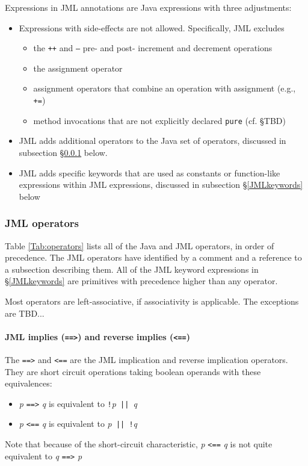 Expressions in JML annotations are Java expressions with three adjustments:
\begin{itemize}
\item Expressions with side-effects are not allowed. Specifically, JML excludes
\begin{itemize}[noitemsep,nolistsep]
\item the \texttt{++} and \texttt{--} pre- and post- increment and decrement operations
\item the assignment operator
\item assignment operators that combine an operation with assignment (e.g., \texttt{+=})
\item method invocations that are not explicitly declared \texttt{pure} (cf. \S TBD)
\end{itemize}
\item JML adds additional operators to the Java set of operators, discussed in subsection \S\ref{JMLoperators} below.
\item JML adds specific keywords that are used as constants or function-like expressions within JML expressions, discussed in subsection \S\ref{JMLkeywords} below
\end{itemize}

\subsubsection{JML operators}
\label{JMLoperators}

Table \ref{Tab:operators} lists all of the Java and JML operators, in order of precedence. The JML operators have identified by a comment and a reference to a subsection describing them. All of the JML keyword expressions in \S\ref{JMLkeywords} are primitives with precedence higher than any operator.

Most operators are left-associative, if associativity is applicable. The exceptions are TBD...


\paragraph{JML implies (\texttt{==>}) and reverse implies (\texttt{<==})}
\label{JMLimplies}

The \texttt{==>} and \texttt{<==} are the JML implication and reverse implication operators. They are short circuit operations taking boolean operands with these equivalences:
\begin{itemize}[noitemsep,nolistsep]
\item \textit{p} \texttt{==>} \textit{q} is equivalent to \texttt{!}\textit{p}\texttt{ || }\textit{q}
\item \textit{p} \texttt{<==} \textit{q} is equivalent to \textit{p}\texttt{ || }\texttt{!}\textit{q}
\end{itemize}
Note that because of the short-circuit characteristic, \textit{p} \texttt{<==} \textit{q} is not quite equivalent to \textit{q} \texttt{==>} \textit{p}


